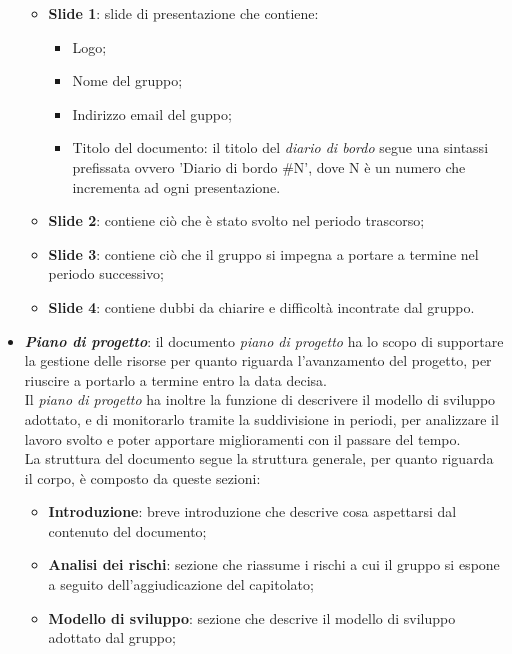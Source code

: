 \begin{itemize}
            \begin{itemize}
                \item \textbf{Slide 1}: slide di presentazione che contiene:
                \begin{itemize}
                    \item Logo;
                    \item Nome del gruppo;
                    \item Indirizzo email del guppo;
                    \item Titolo del documento: il titolo del \textit{diario di bordo} segue una sintassi prefissata ovvero 'Diario di bordo \#N', dove N è un numero che incrementa ad ogni presentazione.
                \end{itemize}
                \item \textbf{Slide 2}: contiene ciò che è stato svolto nel periodo trascorso;
                \item \textbf{Slide 3}: contiene ciò che il gruppo si impegna a portare a termine nel periodo successivo;
                \item \textbf{Slide 4}: contiene dubbi da chiarire e difficoltà incontrate dal gruppo.
            \end{itemize}
            \item \textit{\textbf{Piano di progetto}}: il documento \textit{piano di progetto} ha lo scopo di supportare la gestione delle risorse per quanto riguarda l'avanzamento del progetto, per riuscire a portarlo a termine entro la data decisa.\\
            Il \textit{piano di progetto} ha inoltre la funzione di descrivere il modello di sviluppo adottato, e di monitorarlo tramite la suddivisione in periodi, per analizzare il lavoro svolto e poter apportare miglioramenti con il passare del tempo.
            \\La struttura del documento segue la struttura generale, per quanto riguarda il corpo, è composto da queste sezioni:
            \begin{itemize}
                \item \textbf{Introduzione}: breve introduzione che descrive cosa aspettarsi dal contenuto del documento;
                \item \textbf{Analisi dei rischi}: sezione che riassume i rischi a cui il gruppo si espone a seguito dell'aggiudicazione del capitolato;
                \item \textbf{Modello di sviluppo}: sezione che descrive il modello di sviluppo adottato dal gruppo;

\end{itemize}
\end{itemize}

